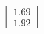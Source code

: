 \documentclass[preview]{standalone}
\begin{document}
\begin{align*}
\begin{bmatrix} 1.69 \\ 1.92 \end{bmatrix}
\end{align*}
\end{document}
